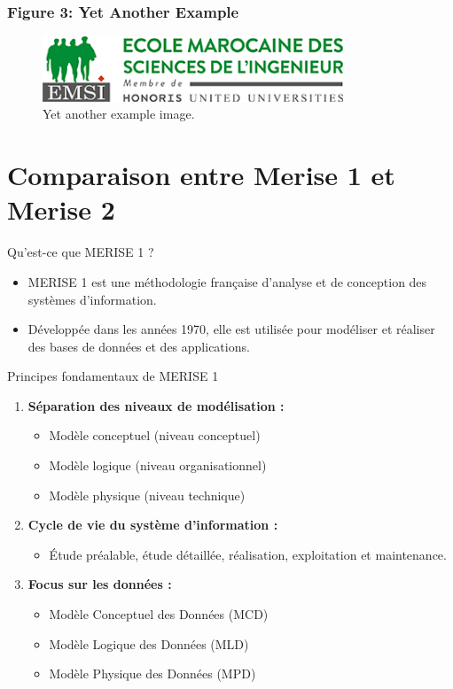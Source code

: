 \documentclass{beamer}
\begin{document}
\begin{frame}
    \frametitle{Figure 3: Yet Another Example}
    \label{fig3}
    \begin{figure}
        \includegraphics[width=0.8\textwidth]{logo}
        \caption{Yet another example image.}
    \end{figure}
\end{frame}


\section{Comparaison entre Merise 1 et Merise 2}

\begin{frame}{Qu'est-ce que MERISE 1 ?}
\begin{itemize}
    \item MERISE 1 est une méthodologie française d’analyse et de conception des systèmes d’information.
    \item Développée dans les années 1970, elle est utilisée pour modéliser et réaliser des bases de données et des applications.
\end{itemize}
\end{frame}

\begin{frame}{Principes fondamentaux de MERISE 1}
\begin{enumerate}
    \item \textbf{Séparation des niveaux de modélisation :}
    \begin{itemize}
        \item Modèle conceptuel (niveau conceptuel)
        \item Modèle logique (niveau organisationnel)
        \item Modèle physique (niveau technique)
    \end{itemize}
    \item \textbf{Cycle de vie du système d’information :}
    \begin{itemize}
        \item Étude préalable, étude détaillée, réalisation, exploitation et maintenance.
    \end{itemize}
    \item \textbf{Focus sur les données :}
    \begin{itemize}
        \item Modèle Conceptuel des Données (MCD)
        \item Modèle Logique des Données (MLD)
        \item Modèle Physique des Données (MPD)
    \end{itemize}
\end{enumerate}
\end{frame}
\end{document}
